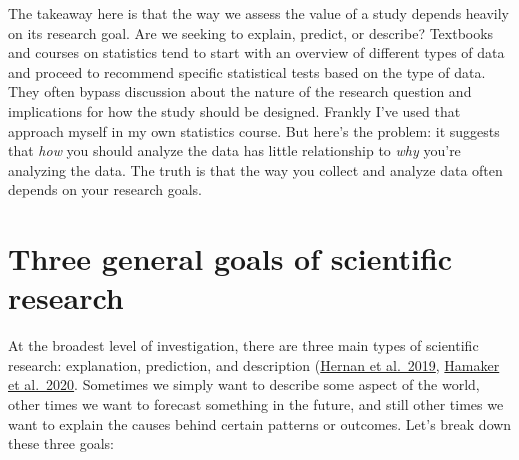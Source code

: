 \documentclass[
]{book}
\begin{document}
The takeaway here is that the way we assess the value of a study depends heavily on its research goal. Are we seeking to explain, predict, or describe? Textbooks and courses on statistics tend to start with an overview of different types of data and proceed to recommend specific statistical tests based on the type of data. They often bypass discussion about the nature of the research question and implications for how the study should be designed. Frankly I've used that approach myself in my own statistics course. But here's the problem: it suggests that \emph{how} you should analyze the data has little relationship to \emph{why} you're analyzing the data. The truth is that the way you collect and analyze data often depends on your research goals.

\section{Three general goals of scientific research}\label{three-general-goals-of-scientific-research}

At the broadest level of investigation, there are three main types of scientific research: explanation, prediction, and description (\href{https://www.tandfonline.com/doi/full/10.1080/09332480.2019.1579578}{Hernan et al.~2019}, \href{https://www.sciencedirect.com/science/article/pii/S1878929320301171}{Hamaker et al.~2020}. Sometimes we simply want to describe some aspect of the world, other times we want to forecast something in the future, and still other times we want to explain the causes behind certain patterns or outcomes. Let's break down these three goals:
\end{document}
